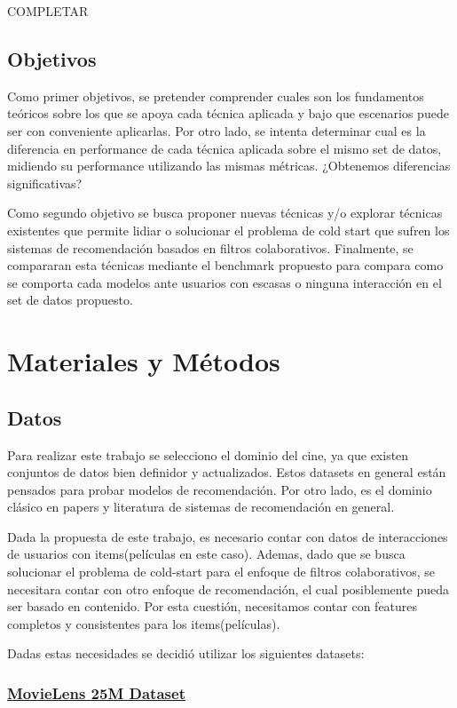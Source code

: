 \documentclass[11pt,a4paper,twoside]{thesis}
\begin{document}
COMPLETAR

\section{Objetivos}

Como primer objetivos, se pretender comprender cuales son los fundamentos teóricos sobre los que se apoya cada técnica aplicada y bajo que escenarios puede ser con conveniente aplicarlas. Por otro lado, se intenta determinar cual es la diferencia en performance de cada técnica aplicada sobre el mismo set de datos, midiendo su performance utilizando las mismas métricas. ¿Obtenemos diferencias significativas?

Como segundo objetivo se busca proponer nuevas técnicas y/o explorar técnicas existentes que permite lidiar o solucionar el problema de cold start que sufren los sistemas de recomendación basados en filtros colaborativos. Finalmente, se compararan esta técnicas mediante el benchmark propuesto para compara como se comporta cada modelos ante usuarios con escasas o ninguna interacción en el set de datos propuesto.

\chapter{Materiales y Métodos}

\section{Datos} 

Para realizar este trabajo se selecciono el dominio del cine, ya que existen conjuntos de datos bien definidor y actualizados. 
Estos datasets en general están pensados para probar modelos de recomendación. Por otro lado, es el dominio clásico en papers 
y literatura de sistemas de recomendación en general.

Dada la propuesta de este trabajo, es necesario contar con datos de interacciones de usuarios con items(películas en este caso). 
Ademas, dado que se busca solucionar el problema de cold-start para el enfoque de filtros colaborativos, se necesitara contar 
con otro enfoque de recomendación, el cual posiblemente pueda ser basado en contenido. Por esta cuestión, necesitamos contar 
con features completos y consistentes para los items(películas).

Dadas estas necesidades se decidió utilizar los siguientes datasets:


\subsection{\href{https://grouplens.org/datasets/movielens/25m/}{MovieLens 25M Dataset}}
\end{document}
